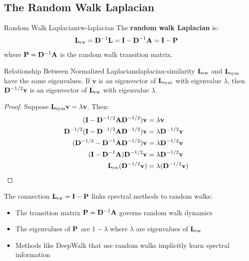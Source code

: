 \begin{notechapter}
\subsection{The Random Walk Laplacian}

\begin{definition}{Random Walk Laplacian}{rw-laplacian}
The \textbf{random walk Laplacian} is:
\begin{equation}
\mathbf{L}_{\text{rw}} = \mathbf{D}^{-1} \mathbf{L} = \mathbf{I} - \mathbf{D}^{-1} \mathbf{A} = \mathbf{I} - \mathbf{P}
\label{graph-laplacians:eq:rw-laplacian}
\end{equation}
where $\mathbf{P} = \mathbf{D}^{-1}\mathbf{A}$ is the random walk transition matrix.
\end{definition}

\begin{theorem}{Relationship Between Normalized Laplacians}{laplacian-similarity}
$\mathbf{L}_{\text{rw}}$ and $\mathbf{L}_{\text{sym}}$ have the same eigenvalues. If $\mathbf{v}$ is an eigenvector of $\mathbf{L}_{\text{sym}}$ with eigenvalue $\lambda$, then $\mathbf{D}^{-1/2}\mathbf{v}$ is an eigenvector of $\mathbf{L}_{\text{rw}}$ with eigenvalue $\lambda$.
\end{theorem}

\begin{proof}
Suppose $\mathbf{L}_{\text{sym}} \mathbf{v} = \lambda \mathbf{v}$. Then:
\begin{align}
(\mathbf{I} - \mathbf{D}^{-1/2}\mathbf{A}\mathbf{D}^{-1/2})\mathbf{v} &= \lambda \mathbf{v} \\
\mathbf{D}^{-1/2}(\mathbf{I} - \mathbf{D}^{-1/2}\mathbf{A}\mathbf{D}^{-1/2})\mathbf{v} &= \lambda \mathbf{D}^{-1/2}\mathbf{v} \\
(\mathbf{D}^{-1/2} - \mathbf{D}^{-1}\mathbf{A}\mathbf{D}^{-1/2})\mathbf{v} &= \lambda \mathbf{D}^{-1/2}\mathbf{v} \\
(\mathbf{I} - \mathbf{D}^{-1}\mathbf{A})\mathbf{D}^{-1/2}\mathbf{v} &= \lambda \mathbf{D}^{-1/2}\mathbf{v} \\
\mathbf{L}_{\text{rw}} (\mathbf{D}^{-1/2}\mathbf{v}) &= \lambda (\mathbf{D}^{-1/2}\mathbf{v}) \qedhere
\end{align}
\end{proof}

\begin{keyidea}
The connection $\mathbf{L}_{\text{rw}} = \mathbf{I} - \mathbf{P}$ links spectral methods to random walks:
\begin{itemize}
    \item The transition matrix $\mathbf{P} = \mathbf{D}^{-1}\mathbf{A}$ governs random walk dynamics
    \item The eigenvalues of $\mathbf{P}$ are $1 - \lambda$ where $\lambda$ are eigenvalues of $\mathbf{L}_{\text{rw}}$
    \item Methods like DeepWalk that use random walks implicitly learn spectral information
\end{itemize}
\end{keyidea}


\end{notechapter}
